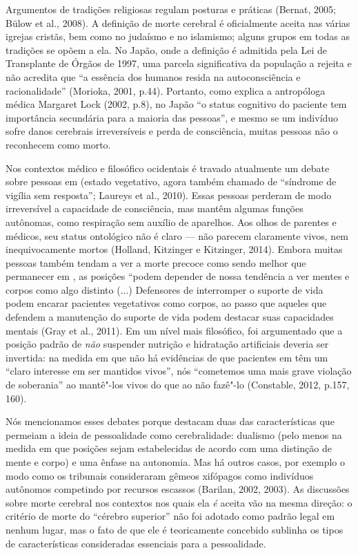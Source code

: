 Argumentos de tradições religiosas regulam posturas e práticas (Bernat,
2005; Bülow et al., 2008). A definição de morte cerebral é oficialmente
aceita nas várias igrejas cristãs, bem como no judaísmo e no islamismo;
alguns grupos em todas as tradições se opõem a ela. No Japão, onde a
definição é admitida pela Lei de Transplante de Órgãos de 1997, uma
parcela significativa da população a rejeita e não acredita que ``a
essência dos humanos resida na autoconsciência e racionalidade''
(Morioka, 2001, p.44). Portanto, como explica a antropóloga médica
Margaret Lock (2002, p.8), no Japão ``o status cognitivo do paciente tem
importância secundária para a maioria das pessoas'', e mesmo se um
indivíduo sofre danos cerebrais irreversíveis e perda de consciência,
muitas pessoas não o reconhecem como morto.

Nos contextos médico e filosófico ocidentais é travado atualmente um
debate sobre pessoas em  (estado vegetativo, agora também chamado de
``síndrome de vigília sem resposta''; Laureys et al., 2010). Essas
pessoas perderam de modo irreversível a capacidade de consciência, mas
mantêm algumas funções autônomas, como respiração sem auxílio de
aparelhos. Aos olhos de parentes e médicos, seu status ontológico não é
claro --- não parecem claramente vivos, nem inequivocamente mortos
(Holland, Kitzinger e Kitzinger, 2014). Embora muitas pessoas também
tendam a ver a morte precoce como sendo melhor que permanecer em , as
posições ``podem depender de nossa tendência a ver mentes e corpos como
algo distinto (...) Defensores de interromper o suporte de vida podem
encarar pacientes vegetativos como corpos, ao passo que aqueles que
defendem a manutenção do suporte de vida podem destacar suas capacidades
mentais (Gray et al., 2011). Em um nível mais filosófico, foi
argumentado que a posição padrão de \emph{não} suspender nutrição e
hidratação artificiais deveria ser invertida: na medida em que não há
evidências de que pacientes em  têm um ``claro interesse em ser
mantidos vivos'', nós ``cometemos uma mais grave violação de soberania''
ao mantê"-los vivos do que ao não fazê"-lo (Constable, 2012, p.157, 160).

Nós mencionamos esses debates porque destacam duas das características
que permeiam a ideia de pessoalidade como cerebralidade: dualismo (pelo
menos na medida em que posições sejam estabelecidas de acordo com uma
distinção de mente e corpo) e uma ênfase na autonomia. Mas há outros
casos, por exemplo o modo como os tribunais consideraram gêmeos
xifópagos como indivíduos autônomos competindo por recursos escassos
(Barilan, 2002, 2003). As discussões sobre morte cerebral nos contextos
nos quais ela \emph{é} aceita vão na mesma direção: o critério de morte
do ``cérebro superior'' não foi adotado como padrão legal em nenhum
lugar, mas o fato de que ele é teoricamente concebido sublinha os tipos
de características consideradas essenciais para a pessoalidade.

